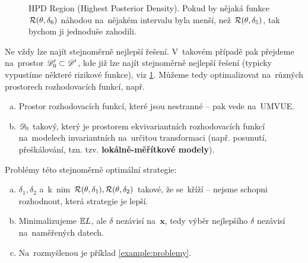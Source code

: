 \begin{figure}[h]
	\centering
	\caption{HPD Region (Highest Posterior Density). Pokud by nějaká funkce $ \mathcal{R} (\theta, \delta_6 )
		$ náhodou na~nějakém intervalu byla menší, než $ \mathcal{R} (\theta, \delta_5 )
		$, tak bychom ji jednoduše zahodili.}\label{HPD}
\end{figure}

Ne vždy lze najít stejnoměrně nejlepší řešení. V~takovém případě pak přejdeme na~prostor $\mathscr{D}'_0\subset\mathscr{D}' $, kde již lze najít stejnoměrně nejlepší řešení (typicky vypustíme některé rizikové funkce), viz \ref{HPD}. Můžeme tedy optimalizovat na~různých prostorech rozhodovacích funkcí, např.
\begin{enumerate}[a)]
	\item  Prostor rozhodovacích funkcí, které jsou nestranné -- pak vede na~UMVUE.
	\item $\mathscr{D} _0$ takový, který je prostorem ekvivariantních rozhodovacích funkcí na~modelech invariantních na~určitou transformaci (např. posunutí, přeškálování, tzn. tzv. \textbf{lokálně-měřítkové modely}).
\end{enumerate}

Problémy této stejnoměrně optimální strategie: \begin{enumerate}[a)]
	\item $\delta_1,\delta_2$ a~k~nim $\mathcal{R}(\theta,\delta_1),\mathcal{R}(\theta,\delta_2)$ takové, že se~kříží -- nejsme schopni rozhodnout, která strategie je lepší.
	\item Minimalizujeme $\mathbb{E} L$, ale $\delta$ nezávisí na~$\textbf{x}$, tedy výběr nejlepšího $\delta$ nezávisí na~naměřených datech.
	\item Na~rozmyšlenou je příklad \ref{example:problemy}.
\end{enumerate}

